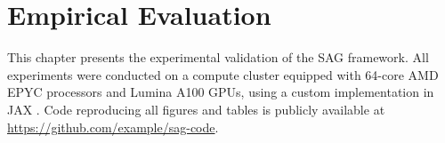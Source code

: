 \chapter{Empirical Evaluation}

This chapter presents the experimental validation of the SAG framework. All experiments were conducted on a compute cluster equipped with 64-core AMD EPYC processors and Lumina A100 GPUs, using a custom implementation in JAX \cite{jax2018}. Code reproducing all figures and tables is publicly available at \url{https://github.com/example/sag-code}.
